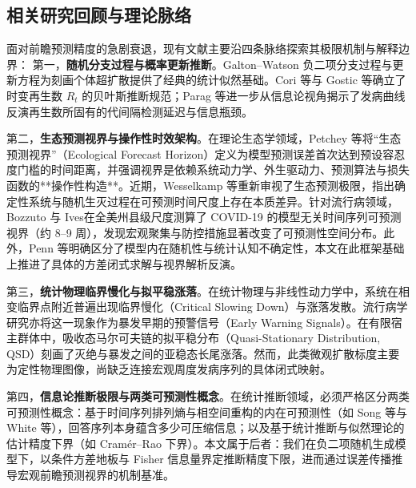 \documentclass[11pt,a4paper]{article}
\theoremstyle{plain}
\theoremstyle{definition}
\begin{document}
\subsection{相关研究回顾与理论脉络}

面对前瞻预测精度的急剧衰退，现有文献主要沿四条脉络探索其极限机制与解释边界：
第一，\textbf{随机分支过程与概率更新推断}。Galton--Watson 负二项分支过程\citep{athreya1972branching}与更新方程为刻画个体超扩散提供了经典的统计似然基础\citep{lloyd-smith2005superspreading}。Cori 等\citep{cori2013framework}与 Gostic 等\citep{gostic2020practical}确立了时变再生数 $R_t$ 的贝叶斯推断规范；Parag 等\citep{parag2020information, parag2022fundamental, parag2022quantifying}进一步从信息论视角揭示了发病曲线反演再生数所固有的代间隔检测延迟与信息瓶颈。

第二，\textbf{生态预测视界与操作性时效架构}。在理论生态学领域，Petchey 等\citep{petchey2015ecological}将“生态预测视界”（Ecological Forecast Horizon）定义为模型预测误差首次达到预设容忍度门槛的时间距离，并强调视界是依赖系统动力学、外生驱动力、预测算法与损失函数的**操作性构造**。近期，Wesselkamp 等\citep{wesselkamp2025forecast}重新审视了生态预测极限，指出确定性系统与随机生灭过程在可预测时间尺度上存在本质差异。针对流行病领域，Bozzuto 与 Ives\citep{bozzuto2023differences}在全美州县级尺度测算了 COVID-19 的模型无关时间序列可预测视界（约 8--9 周），发现宏观聚集与防控措施显著改变了可预测性空间分布。此外，Penn 等\citep{penn2023intrinsic}明确区分了模型内在随机性与统计认知不确定性，本文在此框架基础上推进了具体的方差闭式求解与视界解析反演。

第三，\textbf{统计物理临界慢化与拟平稳涨落}。在统计物理与非线性动力学中，系统在相变临界点附近普遍出现临界慢化（Critical Slowing Down）与涨落发散\citep{grassberger1983critical}。流行病学研究亦将这一现象作为暴发早期的预警信号（Early Warning Signals）\citep{oregan2013theory, southall2021early}。在有限宿主群体中，吸收态马尔可夫链的拟平稳分布（Quasi-Stationary Distribution, QSD）刻画了灭绝与暴发之间的亚稳态长尾涨落\citep{darroch1965quasi, nasell1999quasi, dolgoarshinnykh2006critical}。然而，此类微观扩散标度主要为定性物理图像，尚缺乏连接宏观周度发病序列的具体闭式映射。

第四，\textbf{信息论推断极限与两类可预测性概念}。在统计推断领域，必须严格区分两类可预测性概念：基于时间序列排列熵与相空间重构的内在可预测性（如 Song 等\citep{song2010limits}与 White 等\citep{white2026forecastability}），回答序列本身蕴含多少可压缩信息；以及基于统计推断与似然理论的估计精度下界（如 Cramér--Rao 下界）\citep{parag2022fundamental}。本文属于后者：我们在负二项随机生成模型下，以条件方差地板与 Fisher 信息量界定推断精度下限，进而通过误差传播推导宏观前瞻预测视界的机制基准。
\end{document}
